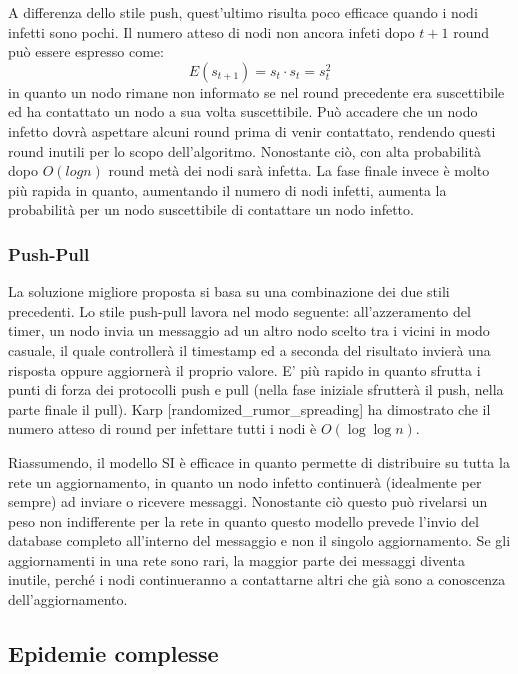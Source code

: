 A differenza dello stile push, quest'ultimo risulta poco efficace quando i nodi infetti sono pochi. Il numero atteso di nodi non ancora infeti dopo $t+1$ round può essere espresso come:
\begin{equation}
    E(s_{t+1}) = s_t \cdot s_t = s_t^2
\end{equation}
in quanto un nodo rimane non informato se nel round precedente era suscettibile ed ha contattato un nodo a sua volta suscettibile. Può accadere che un nodo infetto dovrà aspettare alcuni round prima di venir contattato, rendendo questi round inutili per lo scopo dell'algoritmo. Nonostante ciò, con alta probabilità dopo $O(log n)$ round metà dei nodi sarà infetta. La fase finale invece è molto più rapida in quanto, aumentando il numero di nodi infetti, aumenta la probabilità per un nodo suscettibile di contattare un nodo infetto.
\subsubsection{Push-Pull}
La soluzione migliore proposta si basa su una combinazione dei due stili precedenti. Lo stile push-pull lavora nel modo seguente: all’azzeramento del timer, un nodo invia un messaggio ad un altro nodo scelto tra i vicini in modo casuale, il quale controllerà il timestamp ed a seconda del risultato invierà una risposta oppure aggiornerà il proprio valore. E’ più rapido in quanto sfrutta i punti di forza dei protocolli push e pull (nella fase iniziale sfrutterà il push, nella parte finale il pull). Karp [randomized\_rumor\_spreading] ha dimostrato che il numero atteso di round per infettare tutti i nodi è $O(\log\log n)$.

Riassumendo, il modello SI è efficace in quanto permette di distribuire su tutta la rete un aggiornamento, in quanto un nodo infetto continuerà (idealmente per sempre) ad inviare o ricevere messaggi. Nonostante ciò questo può rivelarsi un peso non indifferente per la rete in quanto questo modello prevede l’invio del database completo all’interno del messaggio e non il singolo aggiornamento. Se gli aggiornamenti in una rete sono rari, la maggior parte dei messaggi diventa inutile, perché i nodi continueranno a contattarne altri che già sono a conoscenza  dell’aggiornamento. 
\subsection{Epidemie complesse}

